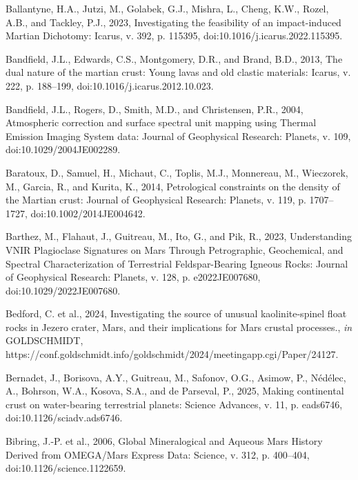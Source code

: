 \documentclass[11pt]{article}
\begin{document}
\begin{thebibliography}{99}
 Ballantyne, H.A., Jutzi, M., Golabek, G.J., Mishra, L., Cheng, K.W., Rozel, A.B., and Tackley, P.J., 2023, Investigating the feasibility of an impact-induced Martian Dichotomy: Icarus, v. 392, p. 115395, doi:10.1016/j.icarus.2022.115395.

 Bandfield, J.L., Edwards, C.S., Montgomery, D.R., and Brand, B.D., 2013, The dual nature of the martian crust: Young lavas and old clastic materials: Icarus, v. 222, p. 188--199, doi:10.1016/j.icarus.2012.10.023.

 Bandfield, J.L., Rogers, D., Smith, M.D., and Christensen, P.R., 2004, Atmospheric correction and surface spectral unit mapping using Thermal Emission Imaging System data: Journal of Geophysical Research: Planets, v. 109, doi:10.1029/2004JE002289.

 Baratoux, D., Samuel, H., Michaut, C., Toplis, M.J., Monnereau, M., Wieczorek, M., Garcia, R., and Kurita, K., 2014, Petrological constraints on the density of the Martian crust: Journal of Geophysical Research: Planets, v. 119, p. 1707--1727, doi:10.1002/2014JE004642.

 Barthez, M., Flahaut, J., Guitreau, M., Ito, G., and Pik, R., 2023, Understanding VNIR Plagioclase Signatures on Mars Through Petrographic, Geochemical, and Spectral Characterization of Terrestrial Feldspar-Bearing Igneous Rocks: Journal of Geophysical Research: Planets, v. 128, p. e2022JE007680, doi:10.1029/2022JE007680.

 Bedford, C. et al., 2024, Investigating the source of unusual kaolinite-spinel float rocks in Jezero crater, Mars, and their implications for Mars crustal processes., \textit{in} GOLDSCHMIDT, https://conf.goldschmidt.info/goldschmidt/2024/meetingapp.cgi/Paper/24127.

 Bernadet, J., Borisova, A.Y., Guitreau, M., Safonov, O.G., Asimow, P., Nédélec, A., Bohrson, W.A., Kosova, S.A., and de Parseval, P., 2025, Making continental crust on water-bearing terrestrial planets: Science Advances, v. 11, p. eads6746, doi:10.1126/sciadv.ads6746.

 Bibring, J.-P. et al., 2006, Global Mineralogical and Aqueous Mars History Derived from OMEGA/Mars Express Data: Science, v. 312, p. 400--404, doi:10.1126/science.1122659.


\end{thebibliography}
\end{document}
